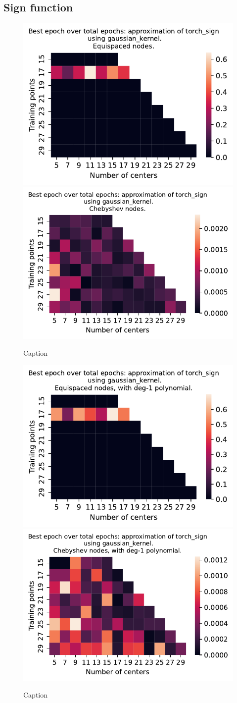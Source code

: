 \documentclass[12pt]{report} %
\begin{document}
\subsection*{Sign function}

\begin{figure}[ht]
    \centering
    
    \includegraphics[width=.49\textwidth]{imagenes/experiments/1d/variational_epochs/torch_sign-Kgaussian_kernel-Equi-epochs.pdf}
    \includegraphics[width=.49\textwidth]{imagenes/experiments/1d/variational_epochs/torch_sign-Kgaussian_kernel-Cheb-epochs.pdf}
    \caption{Caption}
    \label{fig:epochs-torch-sign-gaussian}
\end{figure}


\begin{figure}[ht]
    \centering
    
    \includegraphics[width=.49\textwidth]{imagenes/experiments/1d/variational_epochs/torch_sign-Kgaussian_kernel-Poly-Equi-epochs.pdf}
    \includegraphics[width=.49\textwidth]{imagenes/experiments/1d/variational_epochs/torch_sign-Kgaussian_kernel-Poly-Cheb-epochs.pdf}
    \caption{Caption}
    \label{fig:epochs-torch-sign-gaussian-poly}
\end{figure}
\end{document}
